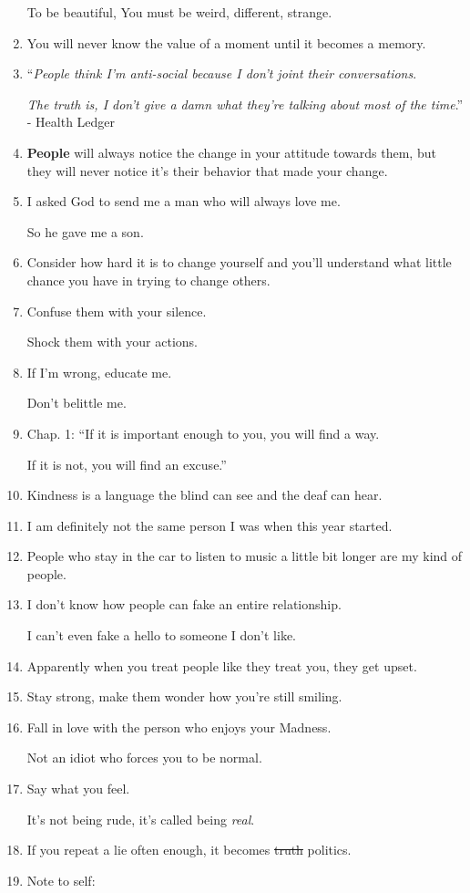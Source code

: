 \documentclass{article}
\begin{document}
\begin{enumerate}
	To be beautiful, You must be weird, different, strange.
	\item You will never know the value of a moment until it becomes a memory.
	\item ``\textit{People think I'm anti-social because I don't joint their conversations}.
	
	\textit{The truth is, I don't give a damn what they're talking about most of the time}.'' - Health Ledger
	\item \textbf{People} will always notice the change in your attitude towards them, but they will never notice it's their behavior that made your change.
	\item I asked God to send me a man who will always love me.
	
	So he gave me a son.
	\item Consider how hard it is to change yourself and you'll understand what little chance you have in trying to change others.
	\item Confuse them with your silence.
	
	Shock them with your actions.
	\item If I'm wrong, educate me.
	
	Don't belittle me.
	\item Chap. 1: ``If it is important enough to you, you will find a way.
	
	If it is not, you will find an excuse.''
	\item Kindness is a language the blind can see and the deaf can hear.
	\item I am definitely not the same person I was when this year started.
	\item People who stay in the car to listen to music a little bit longer are my kind of people.
	\item I don't know how people can fake an entire relationship.
	
	I can't even fake a hello to someone I don't like.
	\item Apparently when you treat people like they treat you, they get upset.
	\item Stay strong, make them wonder how you're still smiling.
	\item Fall in love with the person who enjoys your Madness.
	
	Not an idiot who forces you to be normal.
	\item Say what you feel.
	
	It's not being rude, it's called being \textit{real}.
	\item If you repeat a lie often enough, it becomes \st{truth} politics.
	\item Note to self:
	

\end{enumerate}
\end{document}
